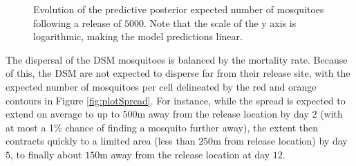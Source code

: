 \documentclass[]{bmcart}
\begin{document}
\begin{figure}[t]
\caption[Evolution of the expected number of mosquitoes following a release of $5000$ at location R]{ Evolution of the predictive posterior expected number of mosquitoes following a release of $5000$. Note that the scale of the y axis is logarithmic, making the model predictions linear.}\label{fig:plotTimeMoxMaxLoc}
\end{figure}

The dispersal of the DSM mosquitoes is balanced by the mortality rate. Because of this, the DSM are not expected to disperse far from their release site, with the expected number of mosquitoes per cell delineated by the red and orange contours in Figure \ref{fig:plotSpread}. For instance, while the spread is expected to extend on average to up to $500$m away from the release location by day $2$ (with at most a 1\% chance of finding a mosquito further away), the extent then contracts quickly to a limited area (less than $250$m from release location) by day $5$, to finally about $150$m away from the release location at day $12$.
\end{document}
